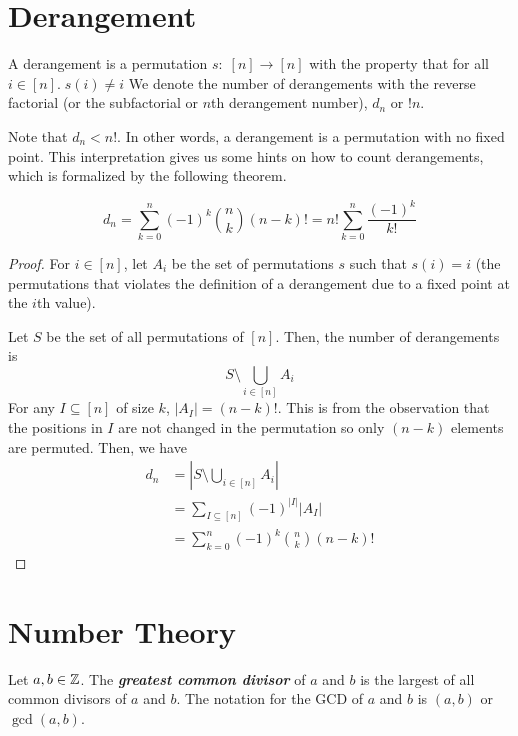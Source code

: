 \section{Derangement}

\begin{definition}[Derangement]
    A derangement is a permutation $s:\; [n] \to [n]$ with the property that for all $i \in [n].\; s(i) \neq i$ We denote the number of derangements with the reverse factorial (or the subfactorial or $n$th derangement number), $d_n$ or $!n$.
\end{definition}

Note that $d_n < n!$. In other words, a derangement is a permutation with no fixed point. This interpretation gives us some hints on how to count derangements, which is formalized by the following theorem.

\begin{theorem}
    $$
    d_n = \sum_{k=0}^n (-1)^k \binom{n}{k} (n-k)! = n! \sum_{k=0}^n \frac{(-1)^k}{k!}
    $$
\end{theorem}

\begin{proof}
    For $i \in [n]$, let $A_i$ be the set of permutations $s$ such that $s(i) = i$ (the permutations that violates the definition of a derangement due to a fixed point at the $i$th value).

    Let $S$ be the set of all permutations of $[n]$. Then, the number of derangements is
    $$
    S \setminus \bigcup_{i \in [n]} A_i
    $$
    For any $I \subseteq [n]$ of size $k$, $|A_I| = (n-k)!$. This is from the observation that the positions in $I$ are not changed in the permutation so only $(n-k)$ elements are permuted. Then, we have
    $$
    \begin{aligned}
        d_n &= \left| S \setminus \bigcup_{i \in [n]} A_i \right| \\
        &= \sum_{I \subseteq [n]} (-1)^{|I|} |A_I| \\
        &= \sum_{k=0}^n (-1)^k \binom{n}{k} (n-k)!
    \end{aligned}
    $$
\end{proof}

\section{Number Theory}

\begin{definition}
    Let $a,b \in \mathbb{Z}$. The \textit{\textbf{greatest common divisor}} of $a$ and $b$ is the largest of all common divisors of $a$ and $b$. The notation for the GCD of $a$ and $b$ is $(a,b)$ or $\gcd(a,b)$.
\end{definition}

